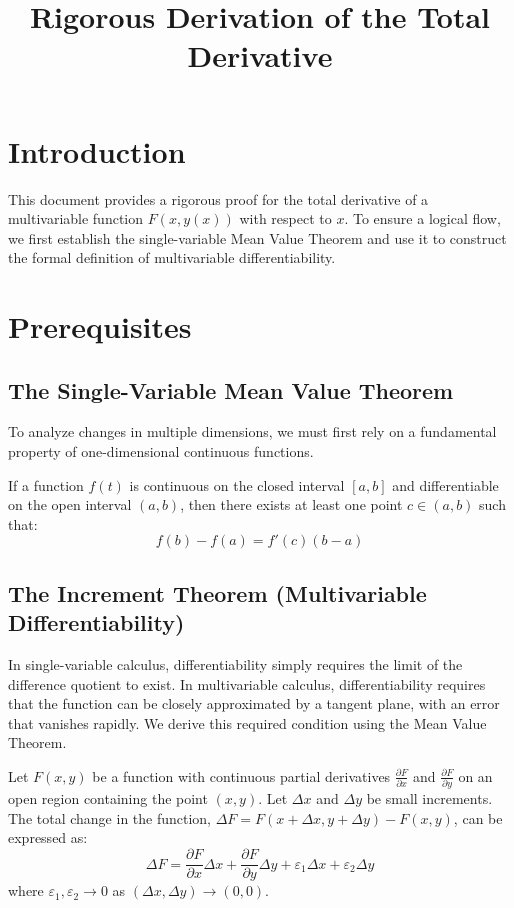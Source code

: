 \documentclass{essay}
\title{Rigorous Derivation of the Total Derivative}
\author{}
\date{}
\begin{document}
\maketitle

\section{Introduction}

This document provides a rigorous proof for the total derivative of a multivariable function \(F(x, y(x))\) with respect to \(x\). To ensure a logical flow, we first establish the single-variable Mean Value Theorem and use it to construct the formal definition of multivariable differentiability.

\section{Prerequisites}

\subsection{The Single-Variable Mean Value Theorem}
To analyze changes in multiple dimensions, we must first rely on a fundamental property of one-dimensional continuous functions.

\begin{lemma}
  If a function \(f(t)\) is continuous on the closed interval \([a, b]\) and differentiable on the open interval \((a, b)\), then there exists at least one point \(c \in (a, b)\) such that:
  \[ f(b) - f(a) = f'(c)(b - a) \]
\end{lemma}

\subsection{The Increment Theorem (Multivariable Differentiability)}
In single-variable calculus, differentiability simply requires the limit of the difference quotient to exist. In multivariable calculus, differentiability requires that the function can be closely approximated by a tangent plane, with an error that vanishes rapidly. We derive this required condition using the Mean Value Theorem.

\begin{theorem}
  Let \(F(x,y)\) be a function with continuous partial derivatives \(\frac{\partial F}{\partial x}\) and \(\frac{\partial F}{\partial y}\) on an open region containing the point \((x,y)\). Let \(\Delta x\) and \(\Delta y\) be small increments. The total change in the function, \(\Delta F = F(x+\Delta x, y+\Delta y) - F(x,y)\), can be expressed as:
  \[ \Delta F = \frac{\partial F}{\partial x}\Delta x + \frac{\partial F}{\partial y}\Delta y + \varepsilon_{1} \Delta x + \varepsilon_{2} \Delta y \]
  where \(\varepsilon_{1}, \varepsilon_{2} \to 0\) as \((\Delta x, \Delta y) \to (0,0)\).
\end{theorem}
\end{document}
